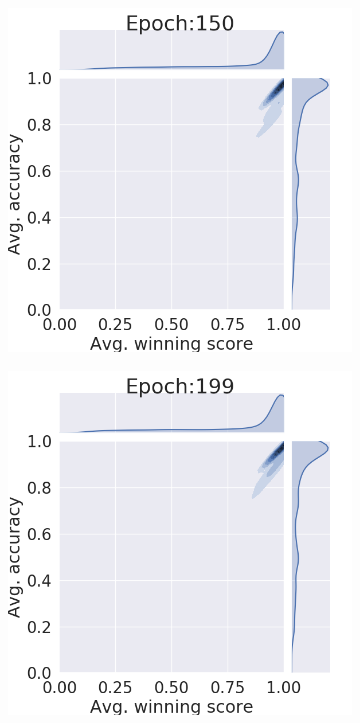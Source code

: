 \begin{figure}[htb]
\begin{subfigure}[b]{0.19\textwidth}
         \caption{}
     \end{subfigure}
          \centering
     \begin{subfigure}[b]{0.19\textwidth}
         \centering
         \noindent\includegraphics[width=\textwidth]{images/joint_plot/no_mixup/150.png}
         \caption{}
     \end{subfigure}
     \hfill
     \begin{subfigure}[b]{0.19\textwidth}
         \centering
         \noindent\includegraphics[width=\textwidth]{images/joint_plot/no_mixup/199.png}

\end{subfigure}
\end{figure}
